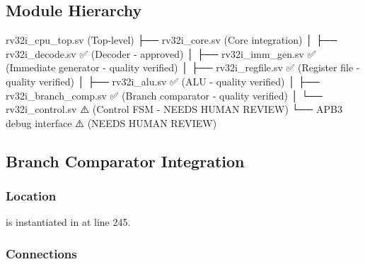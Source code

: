 \subsection{Module Hierarchy}\label{cr:fix:cpu-integration-summary:module-hierarchy}

\begin{record}

\begin{textblock}
rv32i_cpu_top.sv (Top-level)
    ├── rv32i_core.sv (Core integration)
    │   ├── rv32i_decode.sv ✅ (Decoder - approved)
    │   ├── rv32i_imm_gen.sv ✅ (Immediate generator - quality verified)
    │   ├── rv32i_regfile.sv ✅ (Register file - quality verified)
    │   ├── rv32i_alu.sv ✅ (ALU - quality verified)
    │   ├── rv32i_branch_comp.sv ✅ (Branch comparator - quality verified)
    │   └── rv32i_control.sv ⚠️ (Control FSM - NEEDS HUMAN REVIEW)
    └── APB3 debug interface ⚠️ (NEEDS HUMAN REVIEW)
\end{textblock}

\end{record}

\subsection{Branch Comparator Integration}\label{cr:fix:cpu-integration-summary:branch-comparator-integration}

\subsubsection{Location}\label{cr:fix:cpu-integration-summary:location}

\begin{record}

 is instantiated in
\textbf{} at line 245.

\end{record}

\subsubsection{Connections}\label{cr:fix:cpu-integration-summary:connections}

